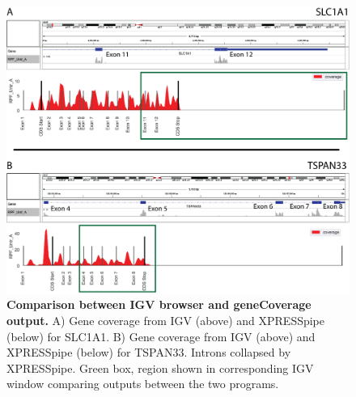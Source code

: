 \documentclass[10pt, oneside]{article}
\begin{document}
\begin{figure}
\centering
  \includegraphics[width=160mm]{figures/xpresspipe_supplement2.png}
  \caption{\textbf{Comparison between IGV browser and geneCoverage output.} A) Gene coverage from IGV (above) and XPRESSpipe (below) for SLC1A1. B) Gene coverage from IGV (above) and XPRESSpipe (below) for TSPAN33. Introns collapsed by XPRESSpipe. Green box, region shown in corresponding IGV window comparing outputs between the two programs.}
  \label{fig:supplement2}
\end{figure}
\end{document}
